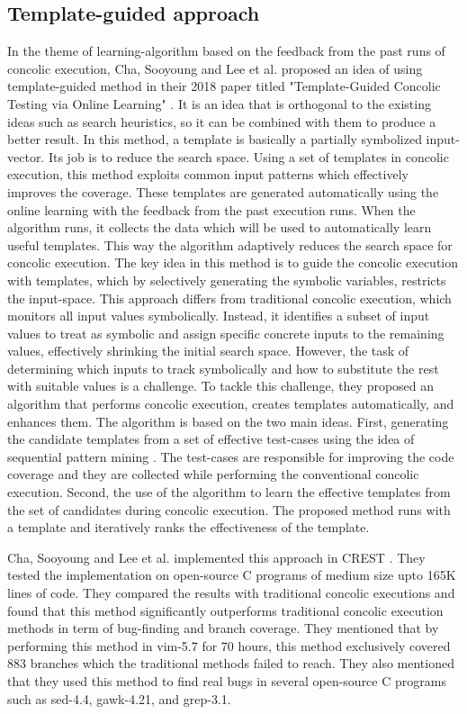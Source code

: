 \documentclass[ runningheads,
               a4paper]{llncs}
\begin{document}


\subsection{Template-guided approach}
In the theme of learning-algorithm based on the feedback from the past runs of concolic execution, Cha, Sooyoung and Lee et al. proposed an idea of using template-guided method in their 2018 paper titled "Template-Guided Concolic Testing via Online Learning" \cite{cha2018template}. It is an idea that is orthogonal to the existing ideas such as search heuristics, so it can be combined with them to produce a better result. In this method, a template is basically a partially symbolized input-vector. Its job is to reduce the search space.
Using a set of templates in concolic execution, this method exploits common input patterns which effectively improves the coverage.
These templates are generated automatically using the online learning with the feedback from the past execution runs. When the algorithm runs, it collects the data which will be used to automatically learn useful templates. This way the algorithm adaptively reduces the search space for concolic execution. The key idea in this method is to guide the concolic execution with templates, which by selectively generating the symbolic variables, restricts the input-space. This approach differs from traditional concolic execution, which monitors all input values symbolically. Instead, it identifies a subset of input values to treat as symbolic and assign specific concrete inputs to the remaining values, effectively shrinking the initial search space. However, the task of determining which inputs to track symbolically and how to substitute the rest with suitable values is a challenge. To tackle this challenge, they proposed an algorithm that performs concolic execution, creates templates automatically, and enhances them. The algorithm is based on the two main ideas. First, generating the candidate templates from a set of effective test-cases using the idea of sequential pattern mining \cite{fumarola2016clofast}. The test-cases are responsible for improving the code coverage and they are collected while performing the conventional concolic execution. Second, the use of the algorithm to learn the effective templates from the set of candidates during concolic execution. The proposed method runs with a template and iteratively ranks the effectiveness of the template.


Cha, Sooyoung and Lee et al. implemented this approach \cite{cha2018template} in CREST \cite{kousik2008heuristic}. They tested the implementation on open-source C programs of medium size upto 165K lines of code. They compared the results with traditional concolic executions and found that this method significantly outperforms traditional concolic execution methods in term of bug-finding and branch coverage. They mentioned that by performing this method in vim-5.7 for 70 hours, this method exclusively covered 883 branches which the traditional methods failed to reach. They also mentioned that they used this method to find real bugs in several open-source C programs such as sed-4.4, gawk-4.21, and grep-3.1.
\end{document}
